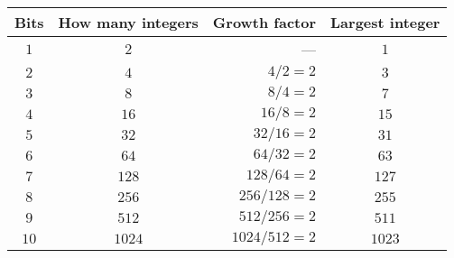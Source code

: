 \begin{tabular}{ccrc}                                           \toprule
Bits & How many integers & Growth factor    & Largest integer \\\midrule
$1$  & $2$               & ---              & $1$             \\[4pt]
$2$  & $4$               & $4 / 2 = 2$      & $3$             \\[4pt]
$3$  & $8$               & $8 / 4 = 2$      & $7$             \\[4pt]
$4$  & $16$              & $16 / 8 = 2$     & $15$            \\[4pt]
$5$  & $32$              & $32 / 16 = 2$    & $31$            \\[4pt]
$6$  & $64$              & $64 / 32 = 2$    & $63$            \\[4pt]
$7$  & $128$             & $128 / 64 = 2$   & $127$           \\[4pt]
$8$  & $256$             & $256 / 128 = 2$  & $255$           \\[4pt]
$9$  & $512$             & $512 / 256 = 2$  & $511$           \\[4pt]
$10$ & $1024$            & $1024 / 512 = 2$ & $1023$          \\\bottomrule
\end{tabular}
